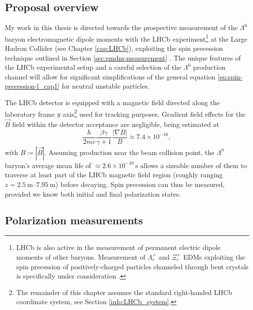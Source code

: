 \subsection{Proposal overview}
My work in this thesis is directed towards the prospective measurement of the $\Lambda^0$ baryon electromagnetic dipole moments with the LHCb experiment\footnote{
LHCb is also active in the measurement of permanent electric dipole moments of other baryons. Measurement of $\Lambda_c^+$ and $\Xi_c^+$ EDMs exploiting the spin precession of positively-charged particles channeled through bent crystals is specifically under consideration \cite{EMDipoleSearch}.
} at the Large Hadron Collider (see Chapter \ref{cap:LHCb}), exploiting the spin precession technique outlined in Section \ref{sec:emdm-measurement} \cite{EMDipoleSearch}.
The unique features of the LHCb experimental setup and a careful selection of the $\Lambda^0$ production channel will allow for significant simplifications of the general equation \eqref{eq:spin-precession-l_cap1} for neutral unstable particles.

The LHCb detector is equipped with a magnetic field directed along the laboratory frame $y$ axis\footnote{The remainder of this chapter assumes the standard right-handed LHCb coordinate system, see Section \ref{info:LHCb_system}.} used for tracking purposes. Gradient field effects for the $\vec{B}$ field within the detector acceptance are negligible, being estimated at \cite{EMDipoleSearch}
\begin{equation}
\frac{\hbar}{2mc} \frac{\beta\gamma}{\gamma+1} \frac{|\nabla B|}{B} \approx 7.4 \times {10}^{-16},
\end{equation}
with $B \coloneqq |\vec{B}|$.
Assuming production near the beam collision point, the $\Lambda^0$ baryon's average mean life of $\approx 2.6 \times {10}^{-10}\, \si{\second}$ \cite{PDG} allows a sizeable number of them to traverse at least part of the LHCb magnetic field region (roughly ranging $z=\SI{2.5}{\meter}$--$\SI{7.95}{\meter}$) before decaying.
Spin precession can thus be measured, provided we know both initial and final polarization states.


\subsection{Polarization measurements}

